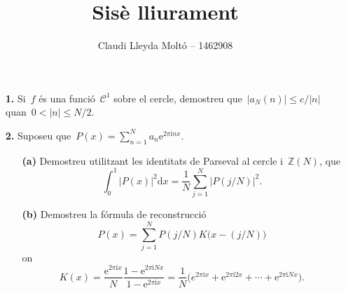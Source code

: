 \documentclass[a4paper]{article}
\title{Sisè lliurament}
\author{Claudi Lleyda Moltó -- 1462908}
\theoremstyle{plain}
\theoremstyle{definition}
\newcommand{\iu}{\mathrm{i}}
\newcommand{\e}{\mathrm{e}}
\providecommand{\uppi}{\pi}
\newcommand{\diff}{\mathrm{d}}
\newcommand{\abs}[1]{\lvert{#1}\rvert}
\newcommand{\ZZ}{\mathbb{Z}}
\begin{document}
\maketitle

\begin{enumerate}
    \item[\textbf{1.}] Si~\(f\) és una funció~\(\mathcal{C}^{1}\) sobre el
        cercle, demostreu que~\(\abs{a_{N}(n)}\leq c/\abs{n}\)
        quan~\(0<\abs{n}\leq N/2\).
\end{enumerate}

\begin{enumerate}
    \item[\textbf{2.}] Suposeu
        que~\(\displaystyle P(x)=\sum_{n=1}^{N}a_{n}\e^{2\uppi\iu nx}\).
        \begin{enumerate}
            \item[\textbf{(a)}] Demostreu utilitzant les identitats de Parseval
                al cercle i~\(\ZZ(N)\), que
                \[
                    \int_{0}^{1}
                    \abs{P(x)}^{2}
                    \diff x
                    =
                    \frac{1}{N}
                    \sum_{j=1}^{N}
                    \abs{P(j/N)}^{2}.
                \]
        \end{enumerate}
\end{enumerate}

\begin{enumerate}
    \item[]\begin{enumerate}
            \item[\textbf{(b)}] Demostreu la fórmula de reconstrucció
                \[
                    P(x)
                    =
                    \sum_{j=1}^{N}
                    P(j/N)
                    K\bigl(x-(j/N)\bigr)
                \]
                on
                \[
                    K(x)
                    =
                    \frac{\e^{2\uppi\iu x}}{N}
                    \frac{1-\e^{2\uppi\iu Nx}}{1-\e^{2\uppi\iu x}}
                    =
                    \frac{1}{N}
                    \bigl(
                        e^{2\uppi\iu x}
                        +
                        \e^{2\uppi\iu2x}
                        + \cdots +
                        \e^{2\uppi\iu Nx}
                    \bigr).
                \]
        \end{enumerate}
\end{enumerate}
\end{document}
